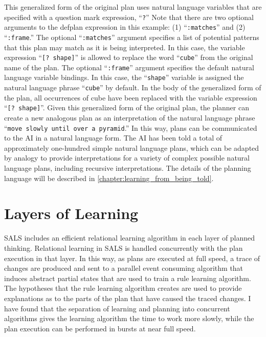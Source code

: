 This generalized form of the original plan uses natural language
variables that are specified with a question mark expression,
``{\tt{?}}''  Note that there are two optional arguments to the
defplan expression in this example: (1) ``{\tt{:matches}}'' and (2)
``{\tt{:frame}}.''  The optional ``{\tt{:matches}}'' argument
specifies a list of potential patterns that this plan may match as it
is being interpreted.  In this case, the variable expression ``{\tt{[?
      shape]}}'' is allowed to replace the word ``{\tt{cube}}'' from
the original name of the plan.  The optional ``{\tt{:frame}}''
argument specifies the default natural language variable bindings.  In
this case, the ``{\tt{shape}}'' variable is assigned the natural
language phrase ``{\tt{cube}}'' by default.  In the body of the
generalized form of the plan, all occurrences of cube have been
replaced with the variable expression ``{\tt{[? shape]}}''.  Given
this generalized form of the original plan, the planner can create a
new analogous plan as an interpretation of the natural language phrase
``{\tt{move slowly until over a pyramid}}.''  In this way, plans can
be communicated to the AI in a natural language form.  The AI has been
told a total of approximately one-hundred simple natural language
plans, which can be adapted by analogy to provide interpretations for
a variety of complex possible natural language plans, including
recursive interpretations.  The details of the planning language will
be described in {\mbox{\autoref{chapter:learning_from_being_told}}}.

\section{Layers of Learning}

SALS includes an efficient relational learning algorithm in each layer
of planned thinking.  Relational learning in SALS is handled
concurrently with the plan execution in that layer.  In this way, as
plans are executed at full speed, a trace of changes are produced and
sent to a parallel event consuming algorithm that induces abstract
partial states that are used to train a rule learning algorithm.  The
hypotheses that the rule learning algorithm creates are used to
provide explanations as to the parts of the plan that have caused the
traced changes.  I have found that the separation of learning and
planning into concurrent algorithms gives the learning algorithm the
time to work more slowly, while the plan execution can be performed in
bursts at near full speed.

